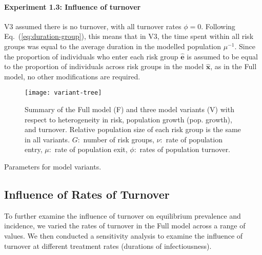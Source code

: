 \paragraph{Experiment 1.3: Influence of turnover}
\label{p:exp-1-turnover}
V3 assumed there is no turnover, with all turnover rates $\phi = 0$.
Following Eq.~(\ref{eq:duration-group}),
this means that in V3, the time spent within all risk groups was equal to
the average duration in the modelled population $\mu^{-1}$.
Since the proportion of individuals who enter each risk group $\bm{\hat{e}}$
is assumed to be equal to
the proportion of individuals across risk groups in the model $\bm{\hat{x}}$,
as in the Full model,
no other modifications are required.
\begin{figure}
  \centering
  \texttt{[image: variant-tree]}
  \caption{Summary of the Full model (F) and three model variants (V)
    with respect to heterogeneity in risk, population growth (pop. growth), and turnover.
    Relative population size of each risk group is the same in all variants.
    $G$:~number of risk groups,
    $\nu$:~rate of population entry,
    $\mu$:~rate of population exit,
    $\phi$:~rates of population turnover.}
  \label{fig:variant-tree}
\end{figure}
\begin{table}
  \centering
  \caption{Parameters for model variants.}
  \label{tab:params-variants}
  
\end{table}
\subsection{Influence of Rates of Turnover}\label{ss:exp-turnover}
To further examine the influence of turnover on
equilibrium prevalence and incidence,
we varied the rates of turnover in the Full model across a range of values.
We then conducted a sensitivity analysis
to examine the influence of turnover
at different treatment rates (durations of infectiousness).

